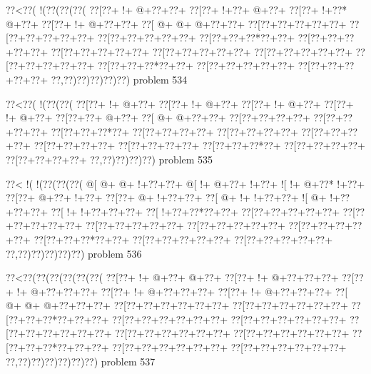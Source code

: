 \vbox{\vbox{\goo
\0??<\0??(\- !(\0??(\0??(\0??(
\0??[\0??+\- !+\- @+\0??+\0??+
\0??[\0??+\- !+\0??+\- @+\0??+
\0??[\0??+\- !+\0??*\- @+\0??+
\0??[\0??+\- !+\- @+\0??+\0??+
\0??[\- @+\- @+\- @+\0??+\0??+
\0??[\0??+\0??+\0??+\0??+\0??+
\0??[\0??+\0??+\0??+\0??+\0??+
\0??[\0??+\0??+\0??+\0??+\0??+
\0??[\0??+\0??+\0??*\0??+\0??+
\0??[\0??+\0??+\0??+\0??+\0??+
\0??[\0??+\0??+\0??+\0??+\0??+
\0??[\0??+\0??+\0??+\0??+\0??+
\0??[\0??+\0??+\0??+\0??+\0??+
\0??[\0??+\0??+\0??+\0??+\0??+
\0??[\0??+\0??+\0??*\0??+\0??+
\0??[\0??+\0??+\0??+\0??+\0??+
\0??[\0??+\0??+\0??+\0??+\0??+
\0??,\0??)\0??)\0??)\0??)\0??)
}
\hfil problem 534\hfil\break
}

\vbox{\vbox{\goo
\0??<\0??(\- !(\0??(\0??(
\0??[\0??+\- !+\- @+\0??+
\0??[\0??+\- !+\- @+\0??+
\0??[\0??+\- !+\- @+\0??+
\0??[\0??+\- !+\- @+\0??+
\0??[\0??+\0??+\- @+\0??+
\0??[\- @+\- @+\0??+\0??+
\0??[\0??+\0??+\0??+\0??+
\0??[\0??+\0??+\0??+\0??+
\0??[\0??+\0??+\0??*\0??+
\0??[\0??+\0??+\0??+\0??+
\0??[\0??+\0??+\0??+\0??+
\0??[\0??+\0??+\0??+\0??+
\0??[\0??+\0??+\0??+\0??+
\0??[\0??+\0??+\0??+\0??+
\0??[\0??+\0??+\0??*\0??+
\0??[\0??+\0??+\0??+\0??+
\0??[\0??+\0??+\0??+\0??+
\0??,\0??)\0??)\0??)\0??)
}
\hfil problem 535\hfil\break
}

\vbox{\vbox{\goo
\0??<\- !(\- !(\0??(\0??(\0??(
\- @[\- @+\- @+\- !+\0??+\0??+
\- @[\- !+\- @+\0??+\- !+\0??+
\- ![\- !+\- @+\0??*\- !+\0??+
\0??[\0??+\- @+\0??+\- !+\0??+
\0??[\0??+\- @+\- !+\0??+\0??+
\0??[\- @+\- !+\- !+\0??+\0??+
\- ![\- @+\- !+\0??+\0??+\0??+
\0??[\- !+\- !+\0??+\0??+\0??+
\0??[\- !+\0??+\0??*\0??+\0??+
\0??[\0??+\0??+\0??+\0??+\0??+
\0??[\0??+\0??+\0??+\0??+\0??+
\0??[\0??+\0??+\0??+\0??+\0??+
\0??[\0??+\0??+\0??+\0??+\0??+
\0??[\0??+\0??+\0??+\0??+\0??+
\0??[\0??+\0??+\0??*\0??+\0??+
\0??[\0??+\0??+\0??+\0??+\0??+
\0??[\0??+\0??+\0??+\0??+\0??+
\0??,\0??)\0??)\0??)\0??)\0??)
}
\hfil problem 536\hfil\break
}

\vbox{\vbox{\goo
\0??<\0??(\0??(\0??(\0??(\0??(\0??(
\0??[\0??+\- !+\- @+\0??+\- @+\0??+
\0??[\0??+\- !+\- @+\0??+\0??+\0??+
\0??[\0??+\- !+\- @+\0??+\0??+\0??+
\0??[\0??+\- !+\- @+\0??+\0??+\0??+
\0??[\0??+\- !+\- @+\0??+\0??+\0??+
\0??[\- @+\- @+\- @+\0??+\0??+\0??+
\0??[\0??+\0??+\0??+\0??+\0??+\0??+
\0??[\0??+\0??+\0??+\0??+\0??+\0??+
\0??[\0??+\0??+\0??*\0??+\0??+\0??+
\0??[\0??+\0??+\0??+\0??+\0??+\0??+
\0??[\0??+\0??+\0??+\0??+\0??+\0??+
\0??[\0??+\0??+\0??+\0??+\0??+\0??+
\0??[\0??+\0??+\0??+\0??+\0??+\0??+
\0??[\0??+\0??+\0??+\0??+\0??+\0??+
\0??[\0??+\0??+\0??*\0??+\0??+\0??+
\0??[\0??+\0??+\0??+\0??+\0??+\0??+
\0??[\0??+\0??+\0??+\0??+\0??+\0??+
\0??,\0??)\0??)\0??)\0??)\0??)\0??)
}
\hfil problem 537\hfil\break
}

